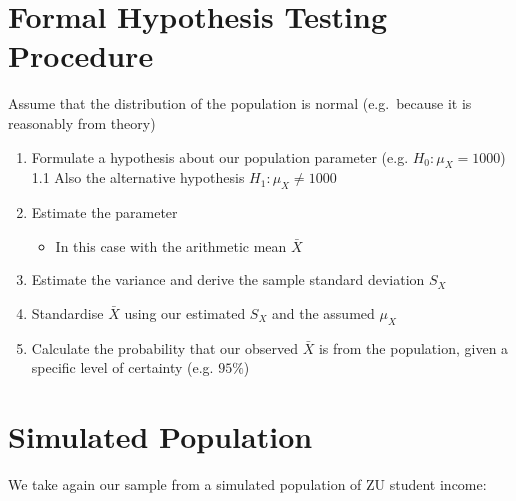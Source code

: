 \documentclass[]{article}
\providecommand{\tightlist}{%
  \setlength{\itemsep}{0pt}\setlength{\parskip}{0pt}}
\begin{document}
\section{Formal Hypothesis Testing
Procedure}\label{formal-hypothesis-testing-procedure}

Assume that the distribution of the population is normal (e.g.~because
it is reasonably from theory)

\begin{enumerate}
\def\labelenumi{\arabic{enumi}.}
\tightlist
\item
  Formulate a hypothesis about our population parameter (e.g.
  \(H_0:\mu_X = 1000\)) 1.1 Also the alternative hypothesis
  \(H_1: \mu_X \neq 1000\)
\item
  Estimate the parameter

  \begin{itemize}
  \tightlist
  \item
    In this case with the arithmetic mean \(\bar{X}\)
  \end{itemize}
\item
  Estimate the variance and derive the sample standard deviation \(S_X\)
\item
  Standardise \(\bar{X}\) using our estimated \(S_X\) and the assumed
  \(\mu_X\)
\item
  Calculate the probability that our observed \(\bar{X}\) is from the
  population, given a specific level of certainty (e.g. \(95 \%\))
\end{enumerate}

\section{Simulated Population}\label{simulated-population}

We take again our sample from a simulated population of ZU student
income:
\end{document}
